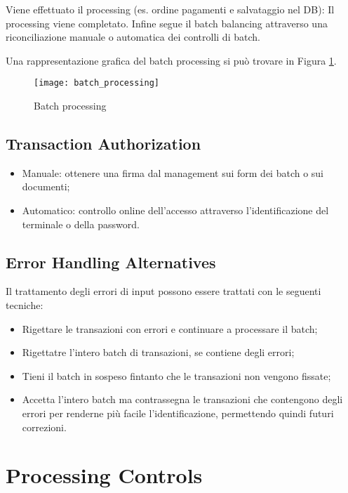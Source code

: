 Viene effettuato il processing (es. ordine pagamenti e salvataggio nel DB):
Il processing viene completato.
Infine segue il batch balancing attraverso 
una riconciliazione manuale o automatica dei controlli di batch.

Una rappresentazione grafica del batch processing si può trovare in 
Figura \ref{fig:security:batch:processing}.
\begin{figure}[h!]
        \begin{center}
                \texttt{[image: batch\_processing]}
        \end{center}
        \caption{Batch processing}
        \label{fig:security:batch:processing}
\end{figure}

\subsection{Transaction Authorization}
\begin{itemize}
    \item Manuale: ottenere una firma dal management sui form dei batch o sui
    documenti;
    \item Automatico: controllo online dell'accesso attraverso 
    l'identificazione del terminale o della password.
\end{itemize}

\subsection{Error Handling Alternatives}
Il trattamento degli errori di input possono essere trattati
con le seguenti tecniche:
\begin{itemize}
\item Rigettare le transazioni con errori e continuare a processare 
il batch;
\item Rigettatre l'intero batch di transazioni, se contiene
degli errori;
\item Tieni il batch in sospeso fintanto che le transazioni 
non vengono fissate;
\item Accetta l'intero batch ma contrassegna le transazioni che
contengono degli errori per renderne più facile l'identificazione,
permettendo quindi futuri correzioni.
\end{itemize}






\section{Processing Controls}

